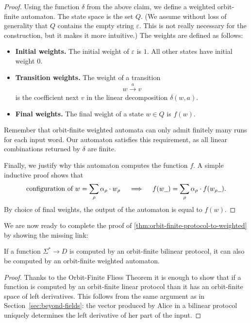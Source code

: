\begin{proof}
    Using the function $\delta$ from the above claim, we define a weighted orbit-finite automaton. The state space is the set $Q$. (We assume without loss of generality that $Q$ contains the empty string $\varepsilon$. This is not really necessary for the construction, but it makes it more intuitive.) The weights are defined as follows: 
    \begin{itemize}
        \item \textbf{Initial weights.} The initial weight of   $\varepsilon$ is $1$. All other states have initial weight $0$.
        \item \textbf{Transition weights.} The weight of a transition 
        \begin{align*}
        w \xrightarrow{a} v
        \end{align*}
    is the coefficient next $v$ in the linear decomposition $\delta(w,a)$.
        \item \textbf{Final weights.} The final weight of a state $w \in Q$ is $f(w)$.
    \end{itemize}
    Remember that orbit-finite weighted automata can only admit finitely many runs for each input word.
    Our automaton satisfies this requirement, as all linear combinations returned by $\delta$ are finite. 

    Finally, we justify why this automaton computes the function $f$.   A simple inductive proof shows that  
    \begin{align*}
\text{configuration of $w$} = \sum_\rho \alpha_\rho \cdot w_\rho
\quad \implies \quad 
        f(w\underline{\hspace{2mm}}) = 
    \sum_\rho \alpha_\rho \cdot f(w_\rho\underline{\hspace{2mm}}).
    \end{align*}
    By choice of final weights,  the output of the automaton is equal to $f(w)$. 
\end{proof}

We are now ready to complete the proof of \cref{thm:orbit-finite-protocol-to-weighted} by showing the missing link:
\begin{claim}
\label{claim:bilinear-prot-to-of-automaton}
    If a function $\Sigma^* \to D$ is computed by an orbit-finite bilinear protocol, it can also be computed by an 
    orbit-finite weighted automaton. 
\end{claim}
\begin{proof}
    Thanks to the Orbit-Finite Fliess Theorem it is enough to show that if a function is computed by an orbit-finite linear 
    protocol than it has an orbit-finite space of left derivatives. This follows from the same argument as in Section~\ref{sec:beyond-fields}:
    the vector produced by Alice in a bilinear protocol uniquely determines the left derivative of her part of the input. 
\end{proof}
